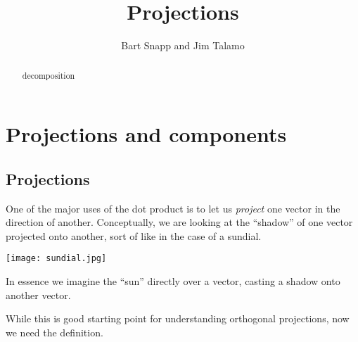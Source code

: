 \documentclass{ximera}
\author{Bart Snapp and Jim Talamo}
\title{Projections}
\begin{document}
\begin{abstract}
decomposition
\end{abstract}
\maketitle


\section{Projections and components}

\subsection{Projections}
One of the major uses of the dot product is to let us \textit{project}
one vector in the direction of another. Conceptually, we are looking
at the ``shadow'' of one vector projected onto another, sort of like
in the case of a sundial.
\begin{image}%
  \texttt{[image: sundial.jpg]}
\end{image}
In essence we imagine the ``sun'' directly over a vector, casting a shadow onto another vector.
\begin{image}
\end{image}






While this is good starting point for understanding orthogonal
projections, now we need the definition.
\end{document}
